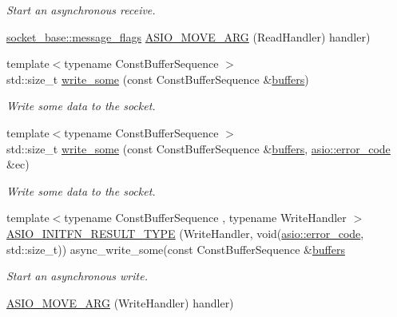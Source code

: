 \begin{DoxyCompactItemize}
\begin{DoxyCompactList}\small\item\em Start an asynchronous receive. \end{DoxyCompactList}\item 
\hyperlink{classasio_1_1socket__base_ac3cf77465dfedfe1979b5415cf32cc94}{socket\+\_\+base\+::message\+\_\+flags} \hyperlink{classasio_1_1basic__stream__socket_ad5b09443b99f5b58ca63bf5f276a352f}{A\+S\+I\+O\+\_\+\+M\+O\+V\+E\+\_\+\+A\+R\+G} (Read\+Handler) handler)
\item 
{\footnotesize template$<$typename Const\+Buffer\+Sequence $>$ }\\std\+::size\+\_\+t \hyperlink{classasio_1_1basic__stream__socket_a181159dc2a64323d39f09563e9fdc4e3}{write\+\_\+some} (const Const\+Buffer\+Sequence \&\hyperlink{group__async__read_ga54dede45c3175148a77fe6635222c47d}{buffers})
\begin{DoxyCompactList}\small\item\em Write some data to the socket. \end{DoxyCompactList}\item 
{\footnotesize template$<$typename Const\+Buffer\+Sequence $>$ }\\std\+::size\+\_\+t \hyperlink{classasio_1_1basic__stream__socket_a6b3873c18a1ce5abf99aa61859ecb058}{write\+\_\+some} (const Const\+Buffer\+Sequence \&\hyperlink{group__async__read_ga54dede45c3175148a77fe6635222c47d}{buffers}, \hyperlink{classasio_1_1error__code}{asio\+::error\+\_\+code} \&ec)
\begin{DoxyCompactList}\small\item\em Write some data to the socket. \end{DoxyCompactList}\item 
{\footnotesize template$<$typename Const\+Buffer\+Sequence , typename Write\+Handler $>$ }\\\hyperlink{classasio_1_1basic__stream__socket_ad159945cedc82195e788407f715bb638}{A\+S\+I\+O\+\_\+\+I\+N\+I\+T\+F\+N\+\_\+\+R\+E\+S\+U\+L\+T\+\_\+\+T\+Y\+P\+E} (Write\+Handler, void(\hyperlink{classasio_1_1error__code}{asio\+::error\+\_\+code}, std\+::size\+\_\+t)) async\+\_\+write\+\_\+some(const Const\+Buffer\+Sequence \&\hyperlink{group__async__read_ga54dede45c3175148a77fe6635222c47d}{buffers}
\begin{DoxyCompactList}\small\item\em Start an asynchronous write. \end{DoxyCompactList}\item 
\hyperlink{classasio_1_1basic__stream__socket_a01062cf1f327c352999ef3aa1efebd98}{A\+S\+I\+O\+\_\+\+M\+O\+V\+E\+\_\+\+A\+R\+G} (Write\+Handler) handler)

\end{DoxyCompactItemize}
